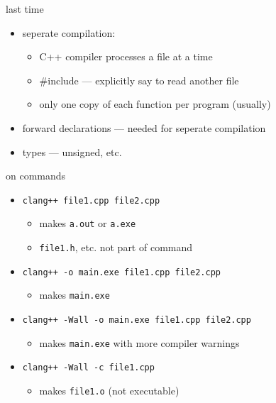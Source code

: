 \begin{frame}{last time}
    \begin{itemize}
    \item seperate compilation:
        \begin{itemize}
        \item C++ compiler processes a file at a time
        \item \#include --- explicitly say to read another file
        \item only one copy of each function per program (usually)
        \end{itemize}
    \item forward declarations --- needed for seperate compilation
    \item types --- unsigned, etc.
    \end{itemize}
\end{frame}

\begin{frame}{on commands}
    \begin{itemize}
    \item {\tt clang++ file1.cpp file2.cpp} 
        \begin{itemize}
        \item makes {\tt a.out} or {\tt a.exe}
        \item {\tt file1.h}, etc. not part of command 
        \end{itemize}
    \item {\tt clang++ -o main.exe file1.cpp file2.cpp} 
        \begin{itemize}
        \item makes {\tt main.exe}
        \end{itemize}
    \item {\tt clang++ -Wall -o main.exe file1.cpp file2.cpp} 
        \begin{itemize}
        \item makes {\tt main.exe} with more compiler warnings
        \end{itemize}
    \item {\tt clang++ -Wall -c file1.cpp} 
        \begin{itemize}
        \item makes {\tt file1.o} (not executable)
        \end{itemize}
    \end{itemize}
\end{frame}
